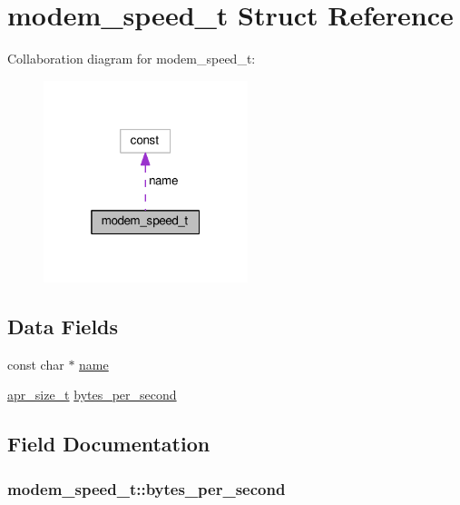 \hypertarget{structmodem__speed__t}{}\section{modem\+\_\+speed\+\_\+t Struct Reference}
\label{structmodem__speed__t}


Collaboration diagram for modem\+\_\+speed\+\_\+t\+:
\nopagebreak
\begin{figure}[H]
\begin{center}
\leavevmode
\includegraphics[width=169pt]{structmodem__speed__t__coll__graph}
\end{center}
\end{figure}
\subsection*{Data Fields}
\begin{DoxyCompactItemize}
\item 
const char $\ast$ \hyperlink{structmodem__speed__t_ac22fb06455dd0bf6ffc512adaab9679c}{name}
\item 
\hyperlink{group__apr__platform_gaaa72b2253f6f3032cefea5712a27540e}{apr\+\_\+size\+\_\+t} \hyperlink{structmodem__speed__t_acb4273968ef0ef58484a9561e053779d}{bytes\+\_\+per\+\_\+second}
\end{DoxyCompactItemize}


\subsection{Field Documentation}
\subsubsection[{\texorpdfstring{bytes\+\_\+per\+\_\+second}{bytes_per_second}}]{ modem\+\_\+speed\+\_\+t\+::bytes\+\_\+per\+\_\+second}\hypertarget{structmodem__speed__t_acb4273968ef0ef58484a9561e053779d}{}\label{structmodem__speed__t_acb4273968ef0ef58484a9561e053779d}
